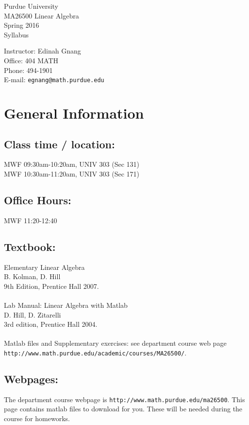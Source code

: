 \documentclass[10pt]{article}
\begin{document}
\noindent\parbox{7cm}{\large Purdue University\\
                    MA26500 Linear Algebra\\
                    Spring 2016\\
                    Syllabus}
\hfill
\parbox{7cm}{\large Instructor: Edinah Gnang\\
                    Office: 404 MATH\\
                    Phone:   494-1901\\
                    E-mail: {\tt egnang@math.purdue.edu}}

\section{General Information}

\subsection{Class time / location:}
                    MWF 09:30am-10:20am, UNIV 303 (Sec 131)\\
                    MWF 10:30am-11:20am, UNIV 303 (Sec 171)\\ 

\subsection{Office Hours:}   
		    MWF 11:20-12:40

\subsection{Textbook:}
                Elementary Linear Algebra\\
                B. Kolman, D. Hill\\
		9th Edition, Prentice Hall 2007.\\
\\
                Lab Manual: Linear Algebra with Matlab\\
		D. Hill, D. Zitarelli\\
		3rd edition, Prentice Hall 2004.\\
\\
                Matlab files and Supplementary exercises: see
                department course web page {\tt http://www.math.purdue.edu/academic/courses/MA26500/}.
\subsection{Webpages:}
\noindent The department course webpage is {\tt http://www.math.purdue.edu/ma26500}. \smallskip
This page contains matlab files to
download for you. These will be needed during the course for homeworks.\smallskip
\end{document}
